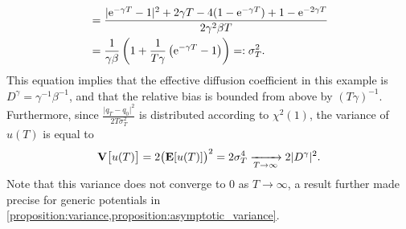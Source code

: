 \documentclass[11pt,a4paper]{article}
\begin{document}
\begin{example}
\begin{align*}
        &= \frac{\lvert \mathrm{e}^{-\gamma T} - 1 \rvert^2 + 2 \gamma T - 4 (1 - \mathrm{e}^{-\gamma T}) +  1 - \mathrm{e}^{-2 \gamma T}}{2 \gamma^2 \beta T} \\
        &= \frac{1}{\gamma \beta} \left( 1 + \frac{1}{T \gamma} \left(\mathrm{e}^{-\gamma T} - 1\right) \right) =: \sigma_T^2.
    \end{align*}
    This equation implies that the effective diffusion coefficient in this example is $D^{\gamma} = \gamma^{-1} \beta^{-1}$,
    and that the relative bias is bounded from above by $(T \gamma)^{-1}$.
    Furthermore,
    since $\frac{\lvert q_T- q_0 \rvert^2}{2T\sigma_T^2}$ is distributed according to $\chi^2(1)$,
    the variance of $u(T)$ is equal to
    \[
        \mathbf{V} \bigl[u(T)\bigr] = 2  \bigl(\mathbf{E} [u(T)]\bigr)^2 = 2 \sigma_T^4 \xrightarrow[T \to \infty]{} 2 \lvert D^{\gamma} \rvert^2 .
    \]
    Note that this variance does not converge to 0 as $T \to \infty$,
    a result further made precise for generic potentials in \cref{proposition:variance,proposition:asymptotic_variance}.
\end{example}
\end{document}
